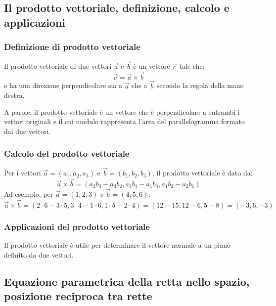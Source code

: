 \documentclass{article}
\begin{document}
\newpage
\subsection{Il prodotto vettoriale, definizione, calcolo e applicazioni}

\subsubsection{Definizione di prodotto vettoriale}
Il prodotto vettoriale di due vettori \(\vec{a}\) e \(\vec{b}\) è un vettore \(\vec{c}\)
tale che:
\[
    \vec{c} = \vec{a} \times \vec{b}
\]
e ha una direzione perpendicolare sia a \(\vec{a}\) che a \(\vec{b}\) secondo la regola
della mano destra.

A parole, il prodotto vettoriale è un vettore che è perpendicolare a entrambi i vettori
originali e il cui modulo rappresenta l'area del parallelogramma formato dai due vettori.

\subsubsection{Calcolo del prodotto vettoriale}
Per i vettori \(\vec{a} = (a_1, a_2, a_3)\) e \(\vec{b} = (b_1, b_2, b_3)\),
il prodotto vettoriale è dato da:
\[
    \vec{a} \times \vec{b} = (a_2 b_3 - a_3 b_2, a_3 b_1 - a_1 b_3, a_1 b_2 - a_2 b_1)
\]
Ad esempio, per \(\vec{a} = (1, 2, 3)\) e \(\vec{b} = (4, 5, 6)\):
\[
    \vec{a} \times \vec{b} = (2 \cdot 6 - 3 \cdot 5, 3 \cdot 4 - 1 \cdot 6, 1 \cdot 5 - 2 \cdot 4) = (12 - 15, 12 - 6, 5 - 8) = (-3, 6, -3)
\]

\subsubsection{Applicazioni del prodotto vettoriale}
Il prodotto vettoriale è utile per determinare il vettore normale a un piano definito da due
vettori.


\newpage
\subsection{Equazione parametrica della retta nello spazio, posizione reciproca tra rette}
\end{document}
